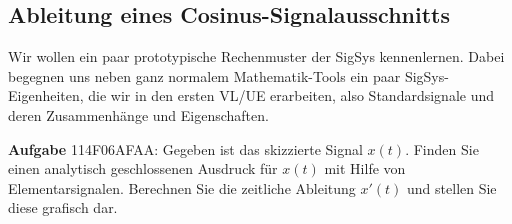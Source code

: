 \subsection{Ableitung eines Cosinus-Signalausschnitts}
\label{sec:114F06AFAA}
\begin{Ziel}
Wir wollen ein paar prototypische
Rechenmuster der SigSys kennenlernen. Dabei begegnen uns neben ganz normalem
Mathematik-Tools ein paar SigSys-Eigenheiten, die wir in den ersten VL/UE
erarbeiten, also Standardsignale und deren Zusammenhänge und Eigenschaften.
\end{Ziel}
\textbf{Aufgabe} {\tiny 114F06AFAA}:
Gegeben ist das skizzierte Signal $x(t)$. Finden Sie einen analytisch geschlossenen
Ausdruck für $x(t)$ mit Hilfe von Elementarsignalen. Berechnen Sie die zeitliche
Ableitung $x'(t)$ und stellen Sie diese grafisch dar.
\begin{center}
\end{center}

